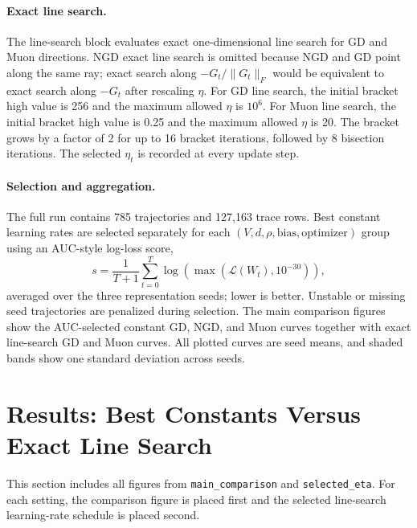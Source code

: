 \documentclass[11pt]{article}
\begin{document}
\paragraph{Exact line search.}
The line-search block evaluates exact one-dimensional line search for GD and Muon directions. NGD exact line search is omitted because NGD and GD point along the same ray; exact search along \(-G_t/\lVert G_t\rVert_F\) would be equivalent to exact search along \(-G_t\) after rescaling \(\eta\). For GD line search, the initial bracket high value is 256 and the maximum allowed \(\eta\) is \(10^6\). For Muon line search, the initial bracket high value is 0.25 and the maximum allowed \(\eta\) is 20. The bracket grows by a factor of 2 for up to 16 bracket iterations, followed by 8 bisection iterations. The selected \(\eta_t\) is recorded at every update step.

\paragraph{Selection and aggregation.}
The full run contains 785 trajectories and 127,163 trace rows. Best constant learning rates are selected separately for each \((V,d,\rho,\text{bias},\text{optimizer})\) group using an AUC-style log-loss score,
\begin{equation}
s = \frac{1}{T+1}\sum_{t=0}^{T}\log\left(\max(\mathcal{L}(W_t),10^{-30})\right),
\end{equation}
averaged over the three representation seeds; lower is better. Unstable or missing seed trajectories are penalized during selection. The main comparison figures show the AUC-selected constant GD, NGD, and Muon curves together with exact line-search GD and Muon curves. All plotted curves are seed means, and shaded bands show one standard deviation across seeds.

\section{Results: Best Constants Versus Exact Line Search}

This section includes all figures from \texttt{main\_comparison} and \texttt{selected\_eta}. For each setting, the comparison figure is placed first and the selected line-search learning-rate schedule is placed second.
\end{document}
